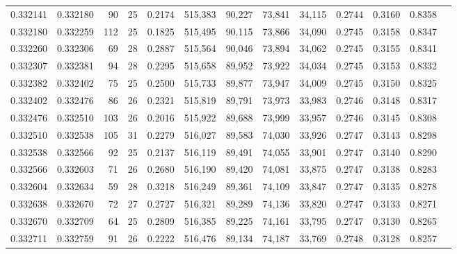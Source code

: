 \begin{tabular}{rrrrrrrrrrrrr}
0.332141 & 0.332180 &    90 &  25 &                                     0.2174 & 515,383 &  90,227 &  73,841 &  34,115 & 0.2744 & 0.3160 & 0.8358 \\
0.332180 & 0.332259 &   112 &  25 &                                     0.1825 & 515,495 &  90,115 &  73,866 &  34,090 & 0.2745 & 0.3158 & 0.8347 \\
0.332260 & 0.332306 &    69 &  28 &                                     0.2887 & 515,564 &  90,046 &  73,894 &  34,062 & 0.2745 & 0.3155 & 0.8341 \\
0.332307 & 0.332381 &    94 &  28 &                                     0.2295 & 515,658 &  89,952 &  73,922 &  34,034 & 0.2745 & 0.3153 & 0.8332 \\
0.332382 & 0.332402 &    75 &  25 &                                     0.2500 & 515,733 &  89,877 &  73,947 &  34,009 & 0.2745 & 0.3150 & 0.8325 \\
0.332402 & 0.332476 &    86 &  26 &                                     0.2321 & 515,819 &  89,791 &  73,973 &  33,983 & 0.2746 & 0.3148 & 0.8317 \\
0.332476 & 0.332510 &   103 &  26 &                                     0.2016 & 515,922 &  89,688 &  73,999 &  33,957 & 0.2746 & 0.3145 & 0.8308 \\
0.332510 & 0.332538 &   105 &  31 &                                     0.2279 & 516,027 &  89,583 &  74,030 &  33,926 & 0.2747 & 0.3143 & 0.8298 \\
0.332538 & 0.332566 &    92 &  25 &                                     0.2137 & 516,119 &  89,491 &  74,055 &  33,901 & 0.2747 & 0.3140 & 0.8290 \\
0.332566 & 0.332603 &    71 &  26 &                                     0.2680 & 516,190 &  89,420 &  74,081 &  33,875 & 0.2747 & 0.3138 & 0.8283 \\
0.332604 & 0.332634 &    59 &  28 &                                     0.3218 & 516,249 &  89,361 &  74,109 &  33,847 & 0.2747 & 0.3135 & 0.8278 \\
0.332638 & 0.332670 &    72 &  27 &                                     0.2727 & 516,321 &  89,289 &  74,136 &  33,820 & 0.2747 & 0.3133 & 0.8271 \\
0.332670 & 0.332709 &    64 &  25 &                                     0.2809 & 516,385 &  89,225 &  74,161 &  33,795 & 0.2747 & 0.3130 & 0.8265 \\
0.332711 & 0.332759 &    91 &  26 &                                     0.2222 & 516,476 &  89,134 &  74,187 &  33,769 & 0.2748 & 0.3128 & 0.8257 \\

\end{tabular}
